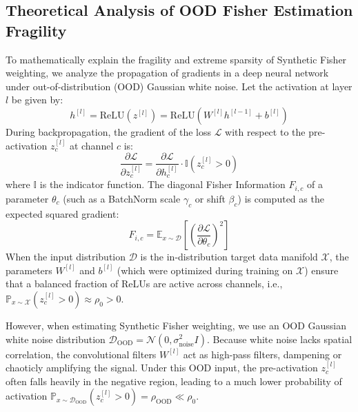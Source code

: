 \documentclass{article}
\theoremstyle{plain}
\theoremstyle{definition}
\theoremstyle{remark}
\begin{document}
\subsection{Theoretical Analysis of OOD Fisher Estimation Fragility}
To mathematically explain the fragility and extreme sparsity of Synthetic Fisher weighting, we analyze the propagation of gradients in a deep neural network under out-of-distribution (OOD) Gaussian white noise. Let the activation at layer $l$ be given by:
\begin{equation}
    h^{[l]} = \text{ReLU}\left(z^{[l]}\right) = \text{ReLU}\left(W^{[l]} h^{[l-1]} + b^{[l]}\right)
\end{equation}
During backpropagation, the gradient of the loss $\mathcal{L}$ with respect to the pre-activation $z^{[l]}_c$ at channel $c$ is:
\begin{equation}
    \frac{\partial \mathcal{L}}{\partial z^{[l]}_c} = \frac{\partial \mathcal{L}}{\partial h^{[l]}_c} \cdot \mathbb{I}\left(z^{[l]}_c > 0\right)
\end{equation}
where $\mathbb{I}$ is the indicator function. The diagonal Fisher Information $F_{i, c}$ of a parameter $\theta_c$ (such as a BatchNorm scale $\gamma_c$ or shift $\beta_c$) is computed as the expected squared gradient:
\begin{equation}
    F_{i, c} = \mathbb{E}_{x \sim \mathcal{D}} \left[ \left( \frac{\partial \mathcal{L}}{\partial \theta_c} \right)^2 \right]
\end{equation}
When the input distribution $\mathcal{D}$ is the in-distribution target data manifold $\mathcal{X}$, the parameters $W^{[l]}$ and $b^{[l]}$ (which were optimized during training on $\mathcal{X}$) ensure that a balanced fraction of ReLUs are active across channels, i.e., $\mathbb{P}_{x \sim \mathcal{X}}\left(z^{[l]}_c > 0\right) \approx \rho_0 > 0$.

However, when estimating Synthetic Fisher weighting, we use an OOD Gaussian white noise distribution $\mathcal{D}_{\text{OOD}} = \mathcal{N}(0, \sigma^2_{\text{noise}} I)$. Because white noise lacks spatial correlation, the convolutional filters $W^{[l]}$ act as high-pass filters, dampening or chaoticly amplifying the signal. Under this OOD input, the pre-activation $z^{[l]}_c$ often falls heavily in the negative region, leading to a much lower probability of activation $\mathbb{P}_{x \sim \mathcal{D}_{\text{OOD}}}\left(z^{[l]}_c > 0\right) = \rho_{\text{OOD}} \ll \rho_0$.
\end{document}
